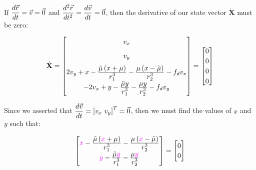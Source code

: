 If $\displaystyle \frac{d\vec{r}}{dt} = \vec{v} = \vec{0}$ and $\displaystyle \frac{d^2\vec{r}}{dt^2} = \frac{d\vec{v}}{dt} = \vec{0}$, then the derivative of our state vector $\dot{\textbf{X}}$ must be zero:

\begin{equation*}
    \dot{\bf{X}} =
    \begin{bmatrix}
        v_x                                                                                                                  \\[0.2cm]
        v_y                                                                                                                  \\[0.2cm]
        2v_y + x - \ddfrac{\tilde{\mu} \left(x+\mu\right)}{r_1^3} - \ddfrac{\mu \left(x-\tilde{\mu}\right)}{r_2^3} - f_d v_x \\[0.2cm]
        -2v_x + y - \ddfrac{\tilde{\mu}y}{r_1^3} - \ddfrac{\mu y}{r_2^3} - f_d v_y
    \end{bmatrix}
    =
    {
    \renewcommand{\arraystretch}{1.2} %
    \begin{bmatrix}
        0 \\
        0 \\
        0 \\
        0
    \end{bmatrix}
    }
\end{equation*}

Since we asserted that $\displaystyle \frac{d\vec{v}}{dt} = \left[v_x \ v_y\right]^T = \vec{0}$, then we must find the values of $x$ and $y$ such that:

\begin{equation}
    \begin{bmatrix}
        \textcolor{magenta}{x} - \ddfrac{\tilde{\mu} \left(\textcolor{magenta}{x}+\mu\right)}{r_1^3} - \ddfrac{\mu \left(\textcolor{magenta}{x}-\tilde{\mu}\right)}{r_2^3} \\[0.2cm]
        \textcolor{magenta}{y} - \ddfrac{\tilde{\mu}\textcolor{magenta}{y}}{r_1^3} - \ddfrac{\mu \textcolor{magenta}{y}}{r_2^3}
    \end{bmatrix}
    =
    {
    \renewcommand{\arraystretch}{1.2} %
    \begin{bmatrix}
        0 \\
        0
    \end{bmatrix}
    }
    \label{eq:roots}
\end{equation}

